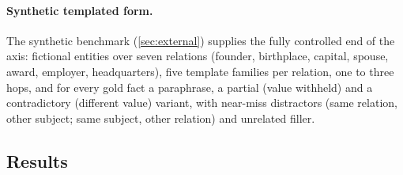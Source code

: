 \paragraph{Synthetic templated form.} The synthetic benchmark (\cref{sec:external}) supplies the fully controlled end of the axis: fictional entities over seven relations (founder, birthplace, capital, spouse, award, employer, headquarters), five template families per relation, one to three hops, and for every gold fact a paraphrase, a partial (value withheld) and a contradictory (different value) variant, with near-miss distractors (same relation, other subject; same subject, other relation) and unrelated filler.

\subsection{Results}
\label{app:estb-results}

\begin{table}[t]
\centering\scriptsize
\setlength{\tabcolsep}{2.5pt}
\resizebox{\linewidth}{!}{}
\caption{Retrieval-source and linguistic-form axes (Qwen2.5-7B, \musique{} 2-hop). Within-run probes on the document split, except the two fully retrieved runs (question split, too few questions for document components). \musique{} direction: transfer without retraining, scored only on questions outside the source probe's training split. Answered rate: the insufficient prompt unpatched, with the full sufficient anchor, and with only the probe-direction component; and the sufficient prompt with $\vdm$ projected to its insufficient value.}
\label{tab:estb}
\end{table}

